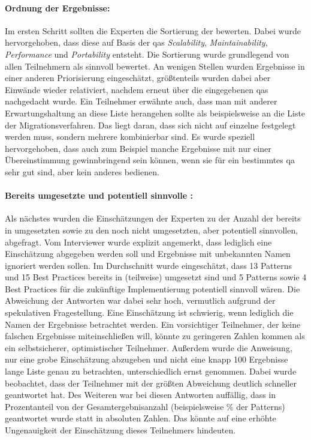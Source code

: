 \paragraph{Ordnung der Ergebnisse:} Im ersten Schritt sollten die Experten die Sortierung der \bpp bewerten.
Dabei wurde hervorgehoben, dass diese auf Basis der \glspl{qa} \emph{Scalability}, \emph{Maintainability}, \emph{Performance} und \emph{Portability} entsteht.
Die Sortierung wurde grundlegend von allen Teilnehmern als sinnvoll bewertet.
An wenigen Stellen wurden Ergebnisse in einer anderen Priorisierung eingeschätzt, größtenteils wurden dabei aber Einwände wieder relativiert, nachdem erneut über die eingegebenen \glspl{qa} nachgedacht wurde.
Ein Teilnehmer erwähnte auch, dass man mit anderer Erwartungshaltung an diese Liste herangehen sollte als beispielsweise an die Liste der Migrationsverfahren.
Das liegt daran, dass sich nicht auf einzelne \bpp festgelegt werden muss, sondern mehrere kombinierbar sind.
Es wurde speziell hervorgehoben, dass auch zum Beispiel manche Ergebnisse mit nur einer Übereinstimmung gewinnbringend sein können, wenn sie für ein bestimmtes \gls{qa} sehr gut sind, aber kein anderes bedienen.

\paragraph{Bereits umgesetzte und potentiell sinnvolle \bpp:}
Als nächstes wurden die Einschätzungen der Experten zu der Anzahl der bereits in \jf umgesetzten \bpp sowie zu den noch nicht umgesetzten, aber potentiell sinnvollen, abgefragt.
Vom Interviewer wurde explizit angemerkt, dass lediglich eine Einschätzung abgegeben werden soll und Ergebnisse mit unbekannten Namen ignoriert werden sollen.
Im Durchschnitt wurde eingeschätzt, dass 13 Patterns und 15 Best Practices bereits in \jf (teilweise) umgesetzt sind und  5 Patterns sowie 4 Best Practices für die zukünftige Implementierung potentiell sinnvoll wären.
Die Abweichung der Antworten war dabei sehr hoch, vermutlich aufgrund der spekulativen Fragestellung.
Eine Einschätzung ist schwierig, wenn lediglich die Namen der Ergebnisse betrachtet werden.
Ein vorsichtiger Teilnehmer, der keine falschen Ergebnisse mit\-ein\-schließen will, könnte zu geringeren Zahlen kommen als ein selbstsicherer, optimistischer Teilnehmer.
Außerdem wurde die Anweisung, nur eine grobe Einschätzung abzugeben und nicht eine knapp 100 Ergebnisse lange Liste genau zu betrachten, unterschiedlich ernst genommen.
Dabei wurde beobachtet, dass der Teilnehmer mit der größten Abweichung deutlich schneller geantwortet hat.
Des Weiteren war bei diesen Antworten auffällig, dass in Prozentanteil von der Gesamtergebnisanzahl (beispielsweise \% der Patterns\grqq{}) geantwortet wurde statt in absoluten Zahlen.
Das könnte auf eine erhöhte Ungenauigkeit der Einschätzung dieses Teilnehmers hindeuten.

